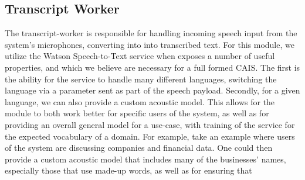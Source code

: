 \subsection{Transcript Worker}

The transcript-worker is responsible for handling incoming speech input from the
system's microphones, converting into into transcribed text. For this module,
we utilize the Watson Speech-to-Text service when exposes a number of useful
properties, and which we believe are necessary for a full formed CAIS. The first
is the ability for the service to handle many different languages, switching
the language via a parameter sent as part of the speech payload. Secondly, for
a given language, we can also provide a custom acoustic model. This allows for
the module to both work better for specific users of the system, as well as for
providing an overall general model for a use-case, with training of the service
for the expected vocabulary of a domain. For example, take an example where
users of the system are discussing companies and financial data. One could then
provide a custom acoustic model that includes many of the businesses' names,
especially those that use made-up words, as well as for ensuring that 